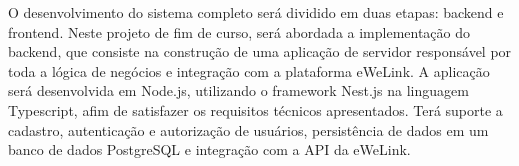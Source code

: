 O desenvolvimento do sistema completo será dividido em duas etapas: backend e frontend. Neste projeto de fim de curso, será abordada a implementação do backend, que consiste na construção de uma aplicação de servidor responsável por toda a lógica de negócios e integração com a plataforma eWeLink. A aplicação será desenvolvida em Node.js, utilizando o framework Nest.js na linguagem Typescript, afim de satisfazer os requisitos técnicos apresentados. Terá suporte a cadastro, autenticação e autorização de usuários, persistência de dados em um banco de dados PostgreSQL e integração com a API da eWeLink.


